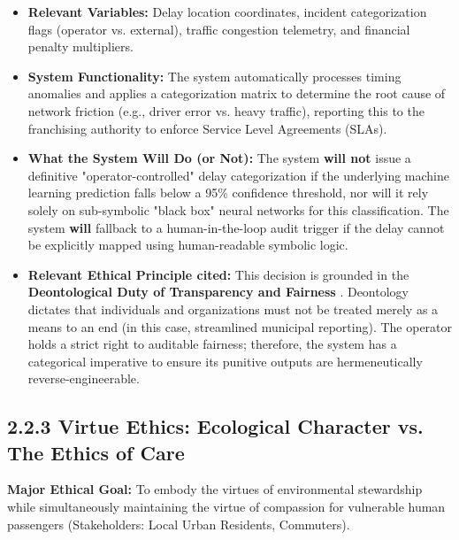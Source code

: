 \documentclass[]
{UCD_CS_41820_Report}
\begin{document}
\begin{itemize}
  \item \textbf{Relevant Variables:} Delay location coordinates, incident categorization flags (operator vs. external), traffic congestion telemetry, and financial penalty multipliers.
  \item \textbf{System Functionality:} The system automatically processes timing anomalies and applies a categorization matrix to determine the root cause of network friction (e.g., driver error vs. heavy traffic), reporting this to the franchising authority to enforce Service Level Agreements (SLAs).
  \item \textbf{What the System Will Do (or Not):} The system \textbf{will not} issue a definitive "operator-controlled" delay categorization if the underlying machine learning prediction falls below a 95\% confidence threshold, nor will it rely solely on sub-symbolic "black box" neural networks for this classification. The system \textbf{will} fallback to a human-in-the-loop audit trigger if the delay cannot be explicitly mapped using human-readable symbolic logic.
  \item \textbf{Relevant Ethical Principle cited:} This decision is grounded in the \textbf{Deontological Duty of Transparency and Fairness} \cite{intro_machine_ethics}. Deontology dictates that individuals and organizations must not be treated merely as a means to an end (in this case, streamlined municipal reporting). The operator holds a strict right to auditable fairness; therefore, the system has a categorical imperative to ensure its punitive outputs are hermeneutically reverse-engineerable.
\end{itemize}

\subsection*{2.2.3 Virtue Ethics: Ecological Character vs. The Ethics of Care}
\textbf{Major Ethical Goal:} To embody the virtues of environmental stewardship while simultaneously maintaining the virtue of compassion for vulnerable human passengers (Stakeholders: Local Urban Residents, Commuters).
\end{document}
